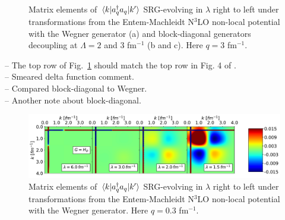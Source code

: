 \documentclass[preprintnumbers,floatfix,aps,prc,preprint,nofootinbib]{revtex4-1}
\begin{document}
\begin{figure}[H]
	\centering
	

	\caption{Matrix elements of $\mel{k}{a^{\dagger}_q a_q}{k'}$ SRG-evolving in $\lambda$ right to left under transformations from the Entem-Machleidt N$^3$LO non-local potential with the Wegner generator (a) and block-diagonal generators decoupling at $\Lambda=2$ and $3$ fm$^{-1}$ (b and c). Here $q=3$ fm$^{-1}$.}
	\label{momentum_projection_contours_q3,00_kvnn10}
\end{figure}

-- The top row of Fig.~\ref{momentum_projection_contours_q3,00_kvnn10} should match the top row in Fig. 4 of \cite{Anderson:2010aq}.
\\
-- Smeared delta function comment.
\\
-- Compared block-diagonal to Wegner.
\\
-- Another note about block-diagonal.

\begin{figure}[H]
	\centering
	\includegraphics[clip,width=0.9\columnwidth]{momentum_projection_contours_q0,30_kvnn10_3S1_Wegner}
	\caption{Matrix elements of $\mel{k}{a^{\dagger}_q a_q}{k'}$ SRG-evolving in $\lambda$ right to left under transformations from the Entem-Machleidt N$^3$LO non-local potential with the Wegner generator. Here $q=0.3$ fm$^{-1}$.}
	\label{momentum_projection_contours_q0,30_kvnn10}
\end{figure}
\end{document}
